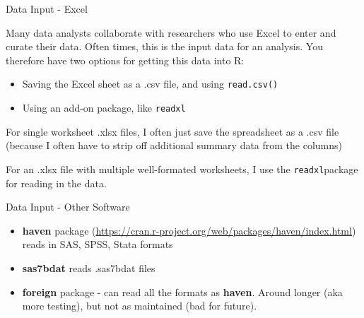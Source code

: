 \documentclass[
  ignorenonframetext,
]{beamer}
\providecommand{\tightlist}{%
  \setlength{\itemsep}{0pt}\setlength{\parskip}{0pt}}
\begin{document}
\begin{frame}[fragile]{Data Input - Excel}
\protect\hypertarget{data-input---excel}{}

Many data analysts collaborate with researchers who use Excel to enter
and curate their data. Often times, this is the input data for an
analysis. You therefore have two options for getting this data into R:

\begin{itemize}
\tightlist
\item
  Saving the Excel sheet as a .csv file, and using \texttt{read.csv()}
\item
  Using an add-on package, like \texttt{readxl}
\end{itemize}

For single worksheet .xlsx files, I often just save the spreadsheet as a
.csv file (because I often have to strip off additional summary data
from the columns)

For an .xlsx file with multiple well-formated worksheets, I use the
\texttt{readxl}package for reading in the data.

\end{frame}

\begin{frame}{Data Input - Other Software}
\protect\hypertarget{data-input---other-software}{}

\begin{itemize}
\tightlist
\item
  \textbf{haven} package
  (\url{https://cran.r-project.org/web/packages/haven/index.html}) reads
  in SAS, SPSS, Stata formats
\item
  \textbf{sas7bdat} reads .sas7bdat files
\item
  \textbf{foreign} package - can read all the formats as \textbf{haven}.
  Around longer (aka more testing), but not as maintained (bad for
  future).
\end{itemize}

\end{frame}
\end{document}
